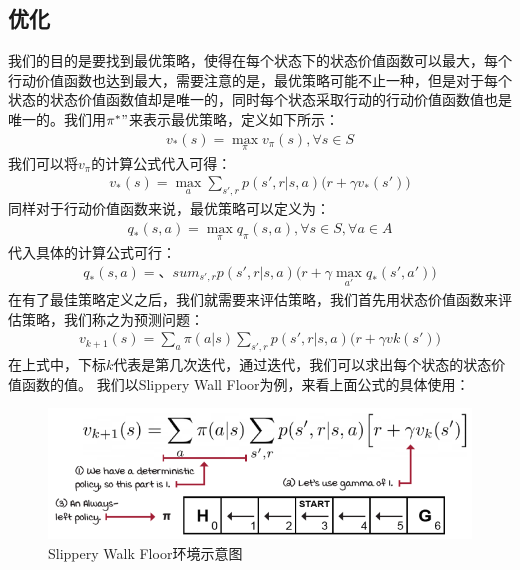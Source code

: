 \subsection{优化}
我们的目的是要找到最优策略，使得在每个状态下的状态价值函数可以最大，每个行动价值函数也达到最大，需要注意的是，最优策略可能不止一种，但是对于每个状态的状态价值函数值却是唯一的，同时每个状态采取行动的行动价值函数值也是唯一的。我们用$\pi^{*}"$来表示最优策略，定义如下所示：
\begin{equation}
\begin{aligned}
v_{*}(s)=\max_{\pi} v_{\pi}(s), \forall s \in S
\end{aligned}
\label{state-value-function-optimal-policy-def1}
\end{equation}
我们可以将$v_{\pi}$的计算公式代入可得：
\begin{equation}
\begin{aligned}
v_{*}(s)=\max_{a} \sum_{s', r} p(s', r | s, a)\bigg( r + \gamma v_{*}(s') \bigg)
\end{aligned}
\label{state-value-function-optimal-policy-def2}
\end{equation}
同样对于行动价值函数来说，最优策略可以定义为：
\begin{equation}
\begin{aligned}
q_{*}(s, a)=\max_{\pi} q_{\pi}(s, a), \forall s \in S, \forall a \in A
\end{aligned}
\label{action-value-function-optimal-policy-def1}
\end{equation}
代入具体的计算公式可行：
\begin{equation}
\begin{aligned}
q_{*}(s, a)=、sum_{s', r} p(s', r | s, a) \bigg( r + \gamma \max_{a'} q_{*}(s', a') \bigg)
\end{aligned}
\label{action-value-function-optimal-policy-def2}
\end{equation}
在有了最佳策略定义之后，我们就需要来评估策略，我们首先用状态价值函数来评估策略，我们称之为预测问题：
\begin{equation}
\begin{aligned}
v_{k+1}(s) = \sum_{a} \pi (a | s) \sum_{s', r} p(s', r | s, a) \bigg( r + \gamma v{k}(s') \bigg)
\end{aligned}
\label{a-v-f-policy-evaluation}
\end{equation}
在上式中，下标$k$代表是第几次迭代，通过迭代，我们可以求出每个状态的状态价值函数的值。
我们以Slippery Wall Floor为例，来看上面公式的具体使用：
\begin{figure}[H]
	\caption{Slippery Walk Floor环境示意图}
	\label{p000009}
	\centering
	\includegraphics[width=15cm]{images/p000009}
\end{figure}
